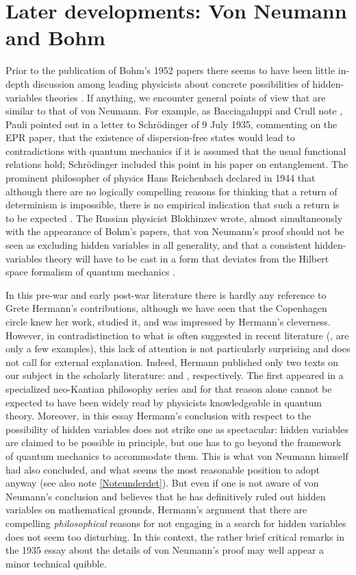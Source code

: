 \documentclass[11pt]{article}
\begin{document}
\section{Later developments: Von Neumann and Bohm}\label{later}

Prior to the publication of Bohm's 1952 papers there seems to have been little in-depth discussion among leading physicists about concrete possibilities of hidden-variables theories \cite[pp.\@ 275--278]{jammer}. If anything, we encounter general points of view that are similar to that of von Neumann. For example, as Bacciagaluppi and Crull note \cite[p.\@ 139]{crull}, Pauli pointed out in a letter to Schr\"{o}dinger of 9 July 1935, commenting on the EPR paper, that the existence of dispersion-free states would lead to contradictions with quantum mechanics if it is assumed that the usual functional relations hold; Schr\"{o}dinger included this point in his paper on entanglement. The prominent philosopher of physics Hans Reichenbach declared in 1944 that although there are no logically compelling reasons for thinking that a return of determinism is impossible, there is no empirical indication that such a return is to be expected \cite[p.\@ 276]{jammer}. The Russian physicist Blokhinzev wrote, almost simultaneously with the appearance of Bohm's papers, that von Neumann's proof should not be seen as excluding hidden variables in all generality, and that a consistent hidden-variables theory will have to be cast in a form that deviates from the Hilbert space formalism of quantum mechanics \cite[p.\@ 277]{jammer}.

In this pre-war and early post-war literature there is hardly any reference to Grete Hermann's contributions, although we have seen that the Copenhagen circle knew her work, studied it, and was impressed by Hermann's cleverness. However, in contradistinction to what is often suggested in recent literature (\cite{mermin,seevinck}, \cite[pp.\@ 13--18]{herzenberg} are only a few examples), this lack of attention is not particularly surprising and does not call for external explanation. Indeed, Hermann published only two texts on our subject in the scholarly literature: \cite{hermann1} and \cite{hermann2}, respectively. The first appeared in a specialized neo-Kantian philosophy series and for that reason alone cannot be expected to have been widely read by physicists knowledgeable in quantum theory. Moreover, in this essay Hermann's conclusion with respect to the possibility of hidden variables does not strike one as spectacular: hidden variables are claimed to be possible in principle, but one has to go beyond the framework of quantum mechanics to accommodate them. This is what von Neumann himself had also concluded, and what seems the most reasonable position to adopt anyway (see also note \ref{Noteunderdet}). But even if one is not aware of von Neumann's conclusion and believes that he has definitively ruled out hidden variables on mathematical grounds, Hermann's argument that there are compelling \emph{philosophical} reasons for not engaging in a search for hidden variables does not seem too disturbing. In this context, the rather brief critical remarks in the 1935 essay about the details of von Neumann's proof may well appear a minor technical quibble.
\end{document}
